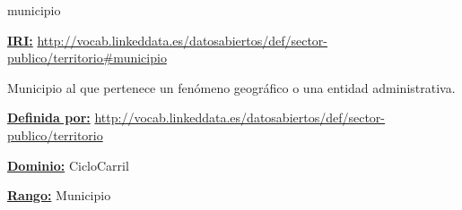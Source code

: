 \begin{mybox}{municipio}
\begin{flushleft}
\underline{\textbf{IRI:}}
\url{http://vocab.linkeddata.es/datosabiertos/def/sector-publico/territorio#municipio}
\newline

Municipio al que pertenece un fenómeno geográfico o una entidad administrativa.
\newline

\underline{\textbf{Definida por:}}
\url{http://vocab.linkeddata.es/datosabiertos/def/sector-publico/territorio}
\newline

\underline{\textbf{Dominio:}}
		CicloCarril
\newline

\underline{\textbf{Rango:}}
		Municipio

\end{flushleft}
\end{mybox}



















